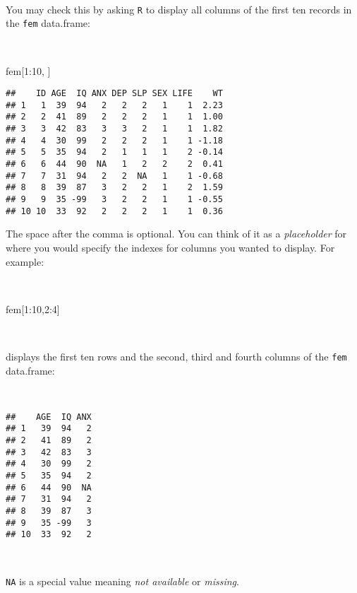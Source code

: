 \documentclass[
  12pt,
  a4paper]{book}
\newenvironment{Shaded}{\begin{snugshade}}{\end{snugshade}}
\newcommand{\DecValTok}[1]{\textcolor[rgb]{0.00,0.00,0.81}{#1}}
\newcommand{\NormalTok}[1]{#1}
\newcommand{\SpecialCharTok}[1]{\textcolor[rgb]{0.00,0.00,0.00}{#1}}
\begin{document}
~

You may check this by asking \texttt{R} to display all columns of the first ten records in the \texttt{fem} data.frame:

~

\begin{Shaded}
\begin{Highlighting}[]
\NormalTok{fem[}\DecValTok{1}\SpecialCharTok{:}\DecValTok{10}\NormalTok{, ]}
\end{Highlighting}
\end{Shaded}

\begin{verbatim}
##    ID AGE  IQ ANX DEP SLP SEX LIFE    WT
## 1   1  39  94   2   2   2   1    1  2.23
## 2   2  41  89   2   2   2   1    1  1.00
## 3   3  42  83   3   3   2   1    1  1.82
## 4   4  30  99   2   2   2   1    1 -1.18
## 5   5  35  94   2   1   1   1    2 -0.14
## 6   6  44  90  NA   1   2   2    2  0.41
## 7   7  31  94   2   2  NA   1    1 -0.68
## 8   8  39  87   3   2   2   1    2  1.59
## 9   9  35 -99   3   2   2   1    1 -0.55
## 10 10  33  92   2   2   2   1    1  0.36
\end{verbatim}

\newpage

The space after the comma is optional. You can think of it as a \emph{placeholder} for where you would specify the indexes for columns you wanted to display. For example:

~

\begin{Shaded}
\begin{Highlighting}[]
\NormalTok{fem[}\DecValTok{1}\SpecialCharTok{:}\DecValTok{10}\NormalTok{,}\DecValTok{2}\SpecialCharTok{:}\DecValTok{4}\NormalTok{]}
\end{Highlighting}
\end{Shaded}

~

displays the first ten rows and the second, third and fourth columns of the \texttt{fem} data.frame:

~

\begin{verbatim}
##    AGE  IQ ANX
## 1   39  94   2
## 2   41  89   2
## 3   42  83   3
## 4   30  99   2
## 5   35  94   2
## 6   44  90  NA
## 7   31  94   2
## 8   39  87   3
## 9   35 -99   3
## 10  33  92   2
\end{verbatim}

~

\texttt{NA} is a special value meaning \emph{not available} or \emph{missing}.
\end{document}
